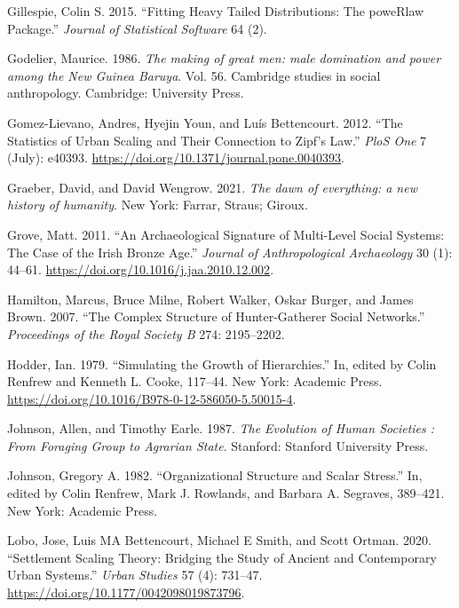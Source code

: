 \documentclass[
  12pt,
]{book}
\newlength{\cslhangindent}
\newlength{\cslentryspacingunit} %
\newenvironment{CSLReferences}[2] %
 {%
  \setlength{\parindent}{0pt}
  \ifodd #1
  \let\oldpar\par
  \def\par{\hangindent=\cslhangindent\oldpar}
  \fi
  \setlength{\parskip}{#2\cslentryspacingunit}
 }%
 {}
\begin{document}
\begin{CSLReferences}{1}{0}
\leavevmode{}%
Gillespie, Colin S. 2015. {``Fitting Heavy Tailed Distributions: The poweRlaw Package.''} \emph{Journal of Statistical Software} 64 (2).

\leavevmode{}%
Godelier, Maurice. 1986. \emph{The making of great men: male domination and power among the New Guinea Baruya}. Vol. 56. Cambridge studies in social anthropology. Cambridge: University Press.

\leavevmode{}%
Gomez-Lievano, Andres, Hyejin Youn, and Luís Bettencourt. 2012. {``The Statistics of Urban Scaling and Their Connection to Zipf{'}s Law.''} \emph{PloS One} 7 (July): e40393. \url{https://doi.org/10.1371/journal.pone.0040393}.

\leavevmode{}%
Graeber, David, and David Wengrow. 2021. \emph{The dawn of everything: a new history of humanity}. New York: Farrar, Straus; Giroux.

\leavevmode{}%
Grove, Matt. 2011. {``An Archaeological Signature of Multi-Level Social Systems: The Case of the Irish Bronze Age.''} \emph{Journal of Anthropological Archaeology} 30 (1): 44--61. \url{https://doi.org/10.1016/j.jaa.2010.12.002}.

\leavevmode{}%
Hamilton, Marcus, Bruce Milne, Robert Walker, Oskar Burger, and James Brown. 2007. {``The Complex Structure of Hunter-Gatherer Social Networks.''} \emph{Proceedings of the Royal Society B} 274: 2195--2202.

\leavevmode{}%
Hodder, Ian. 1979. {``Simulating the Growth of Hierarchies.''} In, edited by Colin Renfrew and Kenneth L. Cooke, 117--44. New York: Academic Press. \url{https://doi.org/10.1016/B978-0-12-586050-5.50015-4}.

\leavevmode{}%
Johnson, Allen, and Timothy Earle. 1987. \emph{The Evolution of Human Societies : From Foraging Group to Agrarian State}. Stanford: Stanford University Press.

\leavevmode{}%
Johnson, Gregory A. 1982. {``Organizational Structure and Scalar Stress.''} In, edited by Colin Renfrew, Mark J. Rowlands, and Barbara A. Segraves, 389--421. New York: Academic Press.

\leavevmode{}%
Lobo, Jose, Luis MA Bettencourt, Michael E Smith, and Scott Ortman. 2020. {``Settlement Scaling Theory: Bridging the Study of Ancient and Contemporary Urban Systems.''} \emph{Urban Studies} 57 (4): 731--47. \url{https://doi.org/10.1177/0042098019873796}.


\end{CSLReferences}
\end{document}
